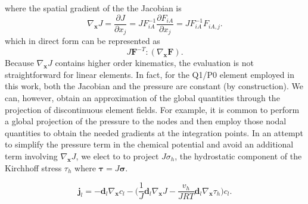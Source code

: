 \documentclass[10pt]{elsarticle}
\newcommand{\mbs}[1]{\boldsymbol{#1}}
\def\bs{{\mbs{s}}} \def\bt{{\mbs{t}}} \def\bu{{\mbs{u}}}
\def\bs{\boldsymbol}
\begin{document}
%
where the spatial gradient of the the Jacobian is 
%
\begin{equation}
\label{eq.gradJ}{ \nabla_{\bs{x}}J} = \frac {\partial J} {\partial x_j} = J F^{-1}_{iA} \frac {\partial F_{iA}} {\partial x_j} = J F^{-1}_{iA} F_{iA,j}.
\end{equation}
which in direct form can be represented as
%
\begin{equation}
J \boldsymbol{F}^{-T}:(\nabla_{\boldsymbol{x}} \boldsymbol{F}).
\end{equation}
%
Because $\nabla_{\bs{x}}J$ contains higher order kinematics, the evaluation is not straightforward for linear elements. In fact, for the Q1/P0 element employed in this work, both the Jacobian and the pressure are constant (by construction). We can, however, obtain an approximation of the global quantities through the projection of discontinuous element fields.  For example, it is common to perform a global projection of the pressure to the nodes and then employ those nodal quantities to obtain the needed gradients at the integration points. In an attempt to simplify the pressure term in the chemical potential and avoid an additional term involving $\nabla_{\bs{x}}J$, we elect to to project $J \sigma_{h}$,  the hydrostatic component of the Kirchhoff stress $\tau_{h}$ where $\bs{\tau} = J \bs{\sigma}$.

%
\begin{equation}
\label{eq.flux3}{\bs{j}_{l} = -\bs{d}_{l}  \nabla_{\bs{x}}c_{l}  - \bigg(\frac{1}{J} \bs{d}_{l} \nabla_{\bs{x}}J -  \frac{v_{h}}{JR T} \bs{d}_{l} \nabla_{\bs{x}} \tau_{h}}\bigg)c_{l}.
\end{equation}
\end{document}
